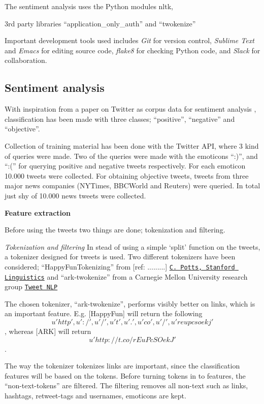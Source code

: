 \documentclass[Main]{subfiles}
\begin{document}



The sentiment analysis uses the Python modules nltk, 

3rd party libraries ``application\_only\_auth'' and ``twokenize''

Important development tools used includes \textit{Git} for version control, \textit{Sublime Text} and \textit{Emacs} for editing source code, \textit{flake8} for checking Python code, and \textit{Slack} for collaboration.




\subsection{Sentiment analysis}


With inspiration from a paper on Twitter as corpus data for sentiment analysis \cite{pak2010twitter}, classification has been made with three classes; ``positive'', ``negative'' and ``objective''.

Collection of training material has been done with the Twitter API, where 3 kind of queries were made. Two of the queries were made with the emoticons ``:)'', and ``:('' for querying positive and negative tweets respectively. For each emoticon 10.000 tweets were collected. For obtaining objective tweets, tweets from three major news companies (NYTimes, BBCWorld and Reuters) were queried. In total just shy of 10.000 news tweets were collected. 

\textbf{Feature extraction}

Before using the tweets two things are done; tokenization and filtering.

\textit{Tokenization and filtering}
In stead of using a simple `split' function on the tweets, a tokenizer designed for tweets is used. Two different tokenizers have been considered; ``HappyFunTokenizing'' from [ref: .........] \href{http://sentiment.christopherpotts.net/tokenizing.html}{\tt C. Potts, Stanford Linguistics} and ``ark-twokenize'' from a Carnegie Mellon University research group \href{http://www.ark.cs.cmu.edu/TweetNLP/}{\tt Tweet NLP}

The chosen tokenizer, ``ark-twokenize'', performs visibly better on links, which is an important feature. E.g. [HappyFun] will return the following 
\[u'http', u':/', u'/', u't', u'.', u'co', u'/', u'reupcsoekj'\], whereas [ARK] will return \[u'http://t.co/rEuPcSOekJ'\].

The way the tokenizer tokenizes links are important, since the classification features will be based on the tokens. Before turning tokens in to features, the ``non-text-tokens'' are filtered. The filtering removes all non-text such as links, hashtags, retweet-tags and usernames, emoticons are kept. 
\end{document}
